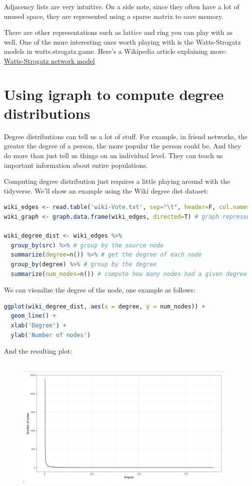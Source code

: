 Adjacency lists are very intuitive. On a side note, since they often have a lot of unused space, they are represented using a sparse matrix to save memory.

There are other representations such as lattice and ring you can play with as well. One of the more interesting ones worth playing with is the Watts-Strogatz models in watts.strogatz.game. Here's a Wikipedia article explaining more: \href{https://en.wikipedia.org/wiki/Watts\%E2\%80\%93Strogatz_model}{Watts-Strogatz network model}

\section{Using igraph to compute degree distributions}

Degree distributions can tell us a lot of stuff. For example, in friend networks, the greater the degree of a person, the more popular the person could be. And they do more than just tell us things on an individual level. They can teach us important information about entire populations.

Computing degree distribution just requires a little playing around with the tidyverse. We'll show an example using the Wiki degree dist dataset:

\begin{lstlisting}[language=R]
wiki_edges <- read.table('wiki-Vote.txt', sep="\t", header=F, col.names=c('src','dst'))
wiki_graph <- graph.data.frame(wiki_edges, directed=T) # graph representation

wiki_degree_dist <- wiki_edges %>%
  group_by(src) %>% # group by the source node
  summarize(degree=n()) %>% # get the degree of each node
  group_by(degree) %>% # group by the degree
  summarize(num_nodes=n()) # compute how many nodes had a given degree
\end{lstlisting}

We can visualize the degree of the node, one example as follows:

\begin{lstlisting}[language=R]
ggplot(wiki_degree_dist, aes(x = degree, y = num_nodes)) +
  geom_line() + 
  xlab('Degree') +
  ylab('Number of nodes')
\end{lstlisting}

And the resulting plot:

\begin{figure}[h]
\includegraphics[width=11cm, height=7cm]{figures/node_deg.png}
\centering
\end{figure}

